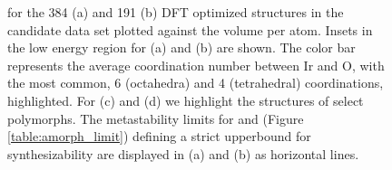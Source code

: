 \begin{figure}[!htb]
\centering
{}
\caption{\label{fig:E_vs_V}
%
\DHf for the \num{384} \IrOtwo (a) and \num{191} \IrOthree (b) DFT optimized structures in the candidate data set plotted against the volume per atom.
%
Insets in the low energy region for (a) and (b) are shown.
%
The color bar represents the average coordination number between Ir and O, with the most common, \num{6} (octahedra) and \num{4} (tetrahedral) coordinations, highlighted.
%
For \IrOtwo (c) and \IrOthree (d) we highlight the structures of select polymorphs.
%
The metastability limits for \IrOtwo and \IrOthree (Figure \ref{table:amorph_limit}) defining a strict upperbound for synthesizability are displayed in (a) and (b) as horizontal lines.
}
\end{figure}


